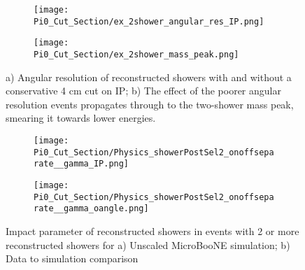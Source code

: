 \begin{figure}[H]
  \begin{subfigure}[t]{0.25\textwidth}
\texttt{[image: Pi0\_Cut\_Section/ex\_2shower\_angular\_res\_IP.png]}
  \caption{ }
  \end{subfigure} 
  \hspace{30mm}
  \begin{subfigure}[t]{0.25\textwidth}
\texttt{[image: Pi0\_Cut\_Section/ex\_2shower\_mass\_peak.png]}
  \caption{ }
  \end{subfigure} 
\caption{ a) Angular resolution of reconstructed showers with and without a conservative 4 cm cut on IP; b) The effect of the poorer angular resolution events propagates through to the two-shower mass peak, smearing it towards lower energies. }
\label{fig:ex_cutjust_IP}
\end{figure}


\begin{figure}[H]
 \begin{subfigure}[t]{0.35\textwidth}
\texttt{[image: Pi0\_Cut\_Section/Physics\_showerPostSel2\_onoffseparate\_\_gamma\_IP.png]}
  \caption{ }
  \end{subfigure} 
\hspace{20mm}
 \begin{subfigure}[t]{0.35\textwidth}
    \texttt{[image: Pi0\_Cut\_Section/Physics\_showerPostSel2\_onoffseparate\_\_gamma\_oangle.png]}
  \caption{ }
  \end{subfigure} 
\caption{ Impact parameter of reconstructed showers in events with 2 or more reconstructed showers for a) Unscaled MicroBooNE simulation; b) Data to simulation comparison }
\label{fig:cutjust_pi0_IP}
\end{figure}


